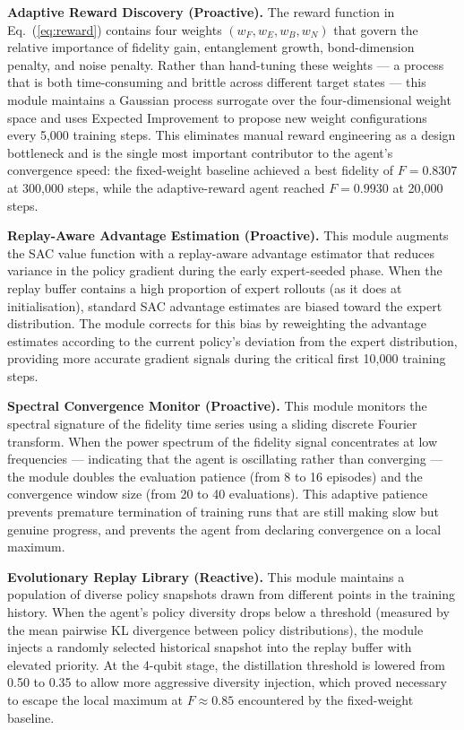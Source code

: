 \textbf{Adaptive Reward Discovery (Proactive).}
The reward function in Eq.~(\ref{eq:reward}) contains four weights
$(w_F, w_E, w_B, w_N)$ that govern the relative importance of fidelity gain,
entanglement growth, bond-dimension penalty, and noise penalty.
Rather than hand-tuning these weights --- a process that is both time-consuming
and brittle across different target states --- this module maintains a Gaussian
process surrogate over the four-dimensional weight space and uses Expected
Improvement to propose new weight configurations every 5,000 training steps.
This eliminates manual reward engineering as a design bottleneck and is the
single most important contributor to the agent's convergence speed: the
fixed-weight baseline achieved a best fidelity of $F = 0.8307$ at 300,000 steps,
while the adaptive-reward agent reached $F = 0.9930$ at 20,000 steps.

\textbf{Replay-Aware Advantage Estimation (Proactive).}
This module augments the SAC value function with a replay-aware advantage
estimator that reduces variance in the policy gradient during the early
expert-seeded phase.
When the replay buffer contains a high proportion of expert rollouts (as it does
at initialisation), standard SAC advantage estimates are biased toward the expert
distribution.
The module corrects for this bias by reweighting the advantage estimates
according to the current policy's deviation from the expert distribution,
providing more accurate gradient signals during the critical first 10,000
training steps.

\textbf{Spectral Convergence Monitor (Proactive).}
This module monitors the spectral signature of the fidelity time series using a
sliding discrete Fourier transform.
When the power spectrum of the fidelity signal concentrates at low frequencies
--- indicating that the agent is oscillating rather than converging --- the module
doubles the evaluation patience (from 8 to 16 episodes) and the convergence
window size (from 20 to 40 evaluations).
This adaptive patience prevents premature termination of training runs that are
still making slow but genuine progress, and prevents the agent from declaring
convergence on a local maximum.

\textbf{Evolutionary Replay Library (Reactive).}
This module maintains a population of diverse policy snapshots drawn from
different points in the training history.
When the agent's policy diversity drops below a threshold (measured by the mean
pairwise KL divergence between policy distributions), the module injects a
randomly selected historical snapshot into the replay buffer with elevated
priority.
At the 4-qubit stage, the distillation threshold is lowered from 0.50 to 0.35
to allow more aggressive diversity injection, which proved necessary to escape
the local maximum at $F \approx 0.85$ encountered by the fixed-weight baseline.

